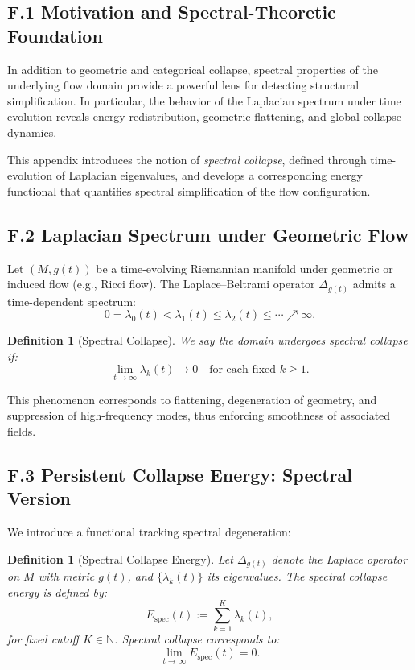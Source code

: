 \documentclass[11pt]{article}
\newtheorem{definition}[theorem]{Definition}
\begin{document}
\subsection{F.1 Motivation and Spectral-Theoretic Foundation}

In addition to geometric and categorical collapse, spectral properties of the underlying flow domain provide a powerful lens for detecting structural simplification. In particular, the behavior of the Laplacian spectrum under time evolution reveals energy redistribution, geometric flattening, and global collapse dynamics.

This appendix introduces the notion of \emph{spectral collapse}, defined through time-evolution of Laplacian eigenvalues, and develops a corresponding energy functional that quantifies spectral simplification of the flow configuration.

\subsection{F.2 Laplacian Spectrum under Geometric Flow}

Let \( (M, g(t)) \) be a time-evolving Riemannian manifold under geometric or induced flow (e.g., Ricci flow). The Laplace–Beltrami operator \( \Delta_{g(t)} \) admits a time-dependent spectrum:
\[
0 = \lambda_0(t) < \lambda_1(t) \leq \lambda_2(t) \leq \cdots \nearrow \infty.
\]

\begin{definition}[Spectral Collapse]
We say the domain undergoes \emph{spectral collapse} if:
\[
\lim_{t \to \infty} \lambda_k(t) \to 0 \quad \text{for each fixed } k \geq 1.
\]
\end{definition}

This phenomenon corresponds to flattening, degeneration of geometry, and suppression of high-frequency modes, thus enforcing smoothness of associated fields.

\subsection{F.3 Persistent Collapse Energy: Spectral Version}

We introduce a functional tracking spectral degeneration:

\begin{definition}[Spectral Collapse Energy]
Let \( \Delta_{g(t)} \) denote the Laplace operator on \( M \) with metric \( g(t) \), and \( \{ \lambda_k(t) \} \) its eigenvalues. The spectral collapse energy is defined by:
\[
E_{\mathrm{spec}}(t) := \sum_{k=1}^K \lambda_k(t),
\]
for fixed cutoff \( K \in \mathbb{N} \). Spectral collapse corresponds to:
\[
\lim_{t \to \infty} E_{\mathrm{spec}}(t) = 0.
\]
\end{definition}
\end{document}
